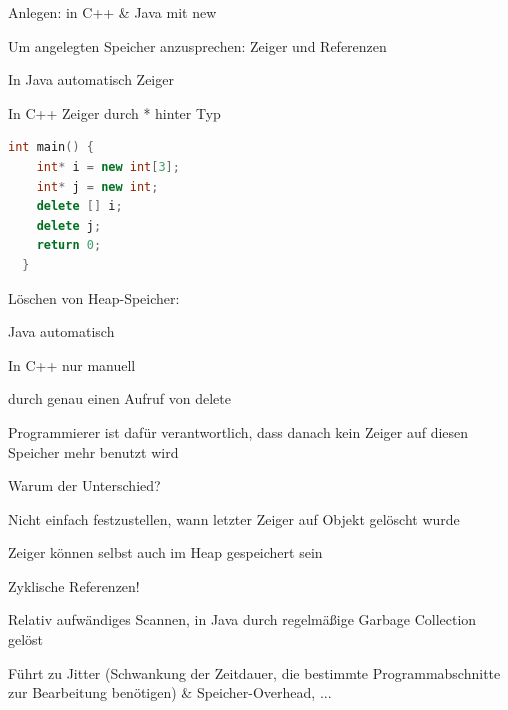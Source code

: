 \documentclass[10pt]{article}
\begin{document}
\begin{itemize*}
  \item Anlegen: in C++ \& Java mit new
  \item Um angelegten Speicher anzusprechen: Zeiger und Referenzen
  \begin{itemize*}
    \item In Java automatisch Zeiger
    \item In C++ Zeiger durch * hinter Typ
    \begin{lstlisting}[language=C++]
  int main() {
    int* i = new int[3];
    int* j = new int;
    delete [] i;
    delete j;
    return 0;
  }
  \end{lstlisting}
  \end{itemize*}
  
  \item Löschen von Heap-Speicher:
  \begin{itemize*}
    \item Java automatisch
    \item In C++ nur manuell
    \begin{itemize*}
      \item durch genau einen Aufruf von delete
      \item Programmierer ist dafür verantwortlich, dass danach kein Zeiger auf diesen Speicher mehr benutzt wird
    \end{itemize*}
  \end{itemize*}
  \item Warum der Unterschied?
  \begin{itemize*}
    \item Nicht einfach festzustellen, wann letzter Zeiger auf Objekt gelöscht wurde
    \begin{itemize*}
      \item Zeiger können selbst auch im Heap gespeichert sein
      \item Zyklische Referenzen!
    \end{itemize*}
    \item Relativ aufwändiges Scannen, in Java durch regelmäßige Garbage Collection gelöst
    \begin{itemize*}
      \item Führt zu Jitter (Schwankung der Zeitdauer, die bestimmte Programmabschnitte zur Bearbeitung benötigen) \& Speicher-Overhead, ...
    \end{itemize*}
  \end{itemize*}
\end{itemize*}
\end{document}
